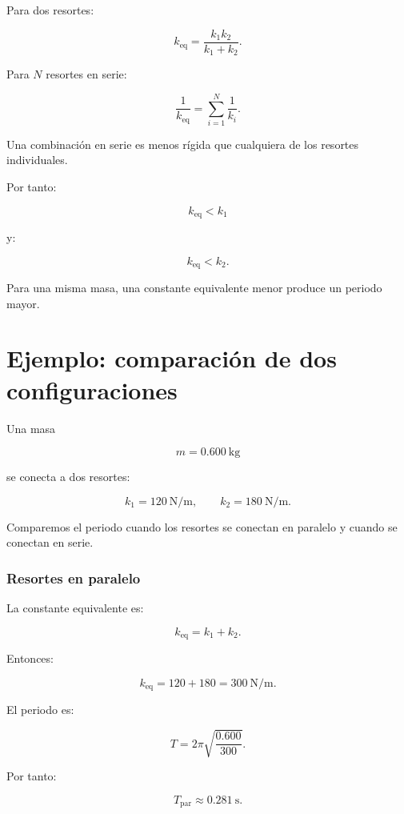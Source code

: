 Para dos resortes:

\[ \boxed{k_{\mathrm{eq}}=\frac{k_1k_2}{k_1+k_2}}. \]

Para \(N\) resortes en serie:

\[ \boxed{\frac{1}{k_{\mathrm{eq}}}=\sum_{i=1}^{N}\frac{1}{k_i}}. \]

\begin{interpretacion}
Una combinación en serie es menos rígida que cualquiera de los resortes individuales.

Por tanto:

\[ k_{\mathrm{eq}}<k_1 \]

y:

\[ k_{\mathrm{eq}}<k_2. \]

Para una misma masa, una constante equivalente menor produce un periodo mayor.
\end{interpretacion}


\section{Ejemplo: comparación de dos configuraciones}

\begin{ejemplo}
Una masa

\[ m=\SI{0.600}{\kilogram} \]

se conecta a dos resortes:

\[
k_1=\SI{120}{\newton\per\meter},
\qquad
k_2=\SI{180}{\newton\per\meter}.
\]

Comparemos el periodo cuando los resortes se conectan en paralelo y cuando se conectan en serie.
\end{ejemplo}

\subsubsection*{Resortes en paralelo}

La constante equivalente es:

\[ k_{\mathrm{eq}}=k_1+k_2. \]

Entonces:

\[
k_{\mathrm{eq}}
=
120+180
=
\SI{300}{\newton\per\meter}.
\]

El periodo es:

\[
T
=
2\pi
\sqrt{
\frac{0.600}{300}
}.
\]

Por tanto:

\[ \boxed{T_{\mathrm{par}}\approx\SI{0.281}{\second}}. \]


